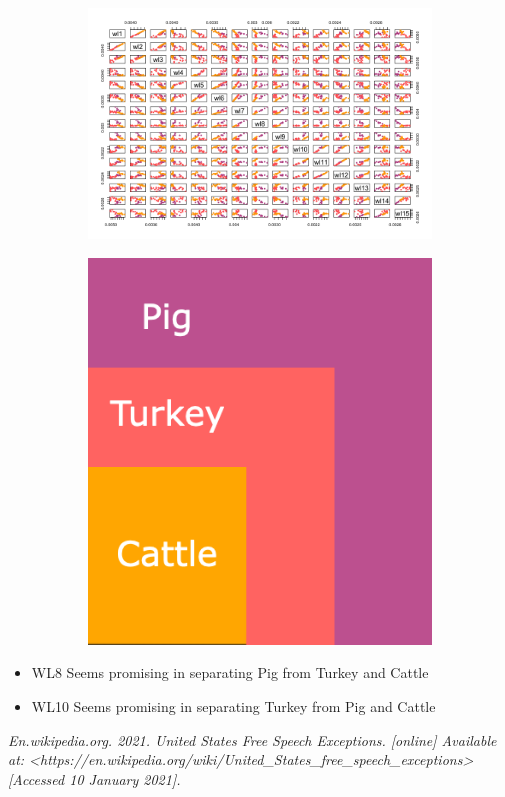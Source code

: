 \documentclass[openany]{article}
\begin{document}
	\begin{figure}[H]
		\begin{subfigure}{\textwidth}
			\centering
			\includegraphics[scale=0.3]{res/Spectroscopy-pairs}
		\end{subfigure}
		
		\begin{subfigure}{\textwidth}
			\centering
			\includegraphics[scale=0.3]{res/Color-Map}
		\end{subfigure}
	\end{figure}
	\begin{itemize}
		\item WL8 Seems promising in separating Pig from Turkey and Cattle
		\item WL10 Seems promising in separating Turkey from Pig and Cattle
	\end{itemize}
	\pagebreak
	\begin{thebibliography}{1}	
		\textit{En.wikipedia.org. 2021. United States Free Speech Exceptions. [online] Available at: <https://en.wikipedia.org/wiki/United\_States\_free\_speech\_exceptions> [Accessed 10 January 2021].}
		
	\end{thebibliography}
\end{document}
